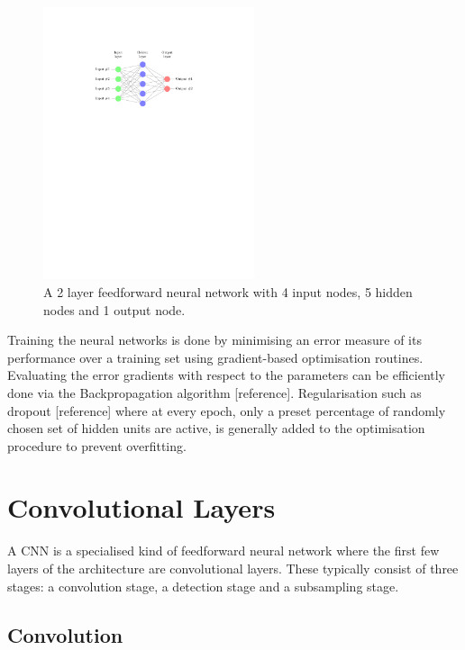 \begin{figure}
\centering
\includegraphics[trim=4cm 17cm 3cm 4cm, clip=true, height=80mm]{Tikz/NN.pdf}
\caption{A 2 layer feedforward neural network with 4 input nodes, 5 hidden nodes and 1 output node.}
\end{figure}

\noindent Training the neural networks is done by minimising an error measure of its performance over a training set using gradient-based optimisation routines. Evaluating the error gradients with respect to the parameters can be efficiently done via the Backpropagation algorithm [reference]. Regularisation such as dropout [reference] where at every epoch, only a preset percentage of randomly chosen set of hidden units are active, is generally added to the optimisation procedure to prevent overfitting.

\section{Convolutional Layers}

\noindent A CNN is a specialised kind of feedforward neural network where the first few layers of the architecture are convolutional layers. These typically consist of three stages: a convolution stage, a detection stage and a subsampling stage. 

\subsection{Convolution}


